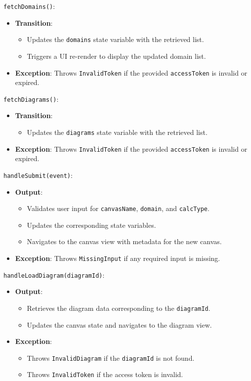 \documentclass[12pt, titlepage]{article}
\begin{document}
\noindent \texttt{fetchDomains()}:
\begin{itemize}
  \item \textbf{Transition}: 
    \begin{itemize}
        \item Updates the \texttt{domains} state variable with the retrieved list.
        \item Triggers a UI re-render to display the updated domain list.
    \end{itemize}
    \item \textbf{Exception}: Throws \texttt{InvalidToken} if the provided \texttt{accessToken} is invalid or expired.
\end{itemize}
\noindent \texttt{fetchDiagrams()}:
\begin{itemize}
    \item \textbf{Transition}: 
    \begin{itemize}
        \item Updates the \texttt{diagrams} state variable with the retrieved list.
    \end{itemize}
    \item \textbf{Exception}: Throws \texttt{InvalidToken} if the provided \texttt{accessToken} is invalid or expired.
\end{itemize}

\noindent \texttt{handleSubmit(event)}:
\begin{itemize}
    \item \textbf{Output}: 
    \begin{itemize}
        \item Validates user input for \texttt{canvasName}, \texttt{domain}, and \texttt{calcType}.
        \item Updates the corresponding state variables.
        \item Navigates to the canvas view with metadata for the new canvas.
    \end{itemize}
    \item \textbf{Exception}: Throws \texttt{MissingInput} if any required input is missing.
\end{itemize}

\noindent \texttt{handleLoadDiagram(diagramId)}:
\begin{itemize}
    \item \textbf{Output}: 
    \begin{itemize}
        \item Retrieves the diagram data corresponding to the \texttt{diagramId}.
        \item Updates the canvas state and navigates to the diagram view.
    \end{itemize}
    \item \textbf{Exception}: 
    \begin{itemize}
        \item Throws \texttt{InvalidDiagram} if the \texttt{diagramId} is not found.
        \item Throws \texttt{InvalidToken} if the access token is invalid.
    \end{itemize}
  \end{itemize}
\end{document}
